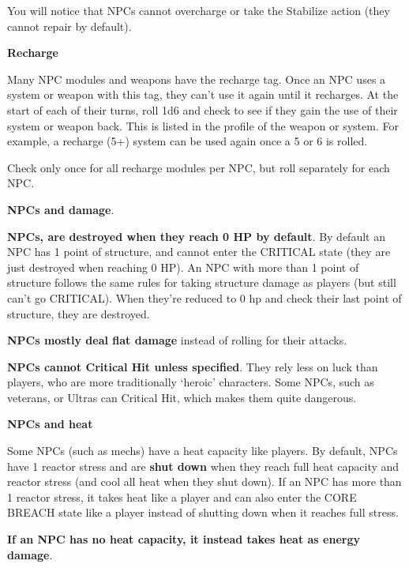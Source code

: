 You will notice that NPCs cannot overcharge or take the Stabilize action (they cannot repair by
default).
             
\begin{center}
    \textbf{Recharge}
\end{center}

Many NPC modules and weapons have the recharge tag. Once an NPC uses a system or
weapon with this tag, they can’t use it again until it recharges. At the start of each of their turns,
roll 1d6 and check to see if they gain the use of their system or weapon back. This is listed in the
profile of the weapon or system. For example, a recharge (5+) system can be used again once a
5 or 6 is rolled.

Check only once for all recharge modules per NPC, but roll separately for each NPC.
              
\begin{center}
    \textbf{NPCs and damage}.
\end{center}

\textbf{NPCs, are destroyed when they reach 0 HP by default}. By default an NPC has 1 point of
structure, and cannot enter the CRITICAL state (they are just destroyed when reaching 0 HP). An
NPC with more than 1 point of structure follows the same rules for taking structure damage as
players (but still can’t go CRITICAL). When they’re reduced to 0 hp and check their last point of
structure, they are destroyed.

\textbf{NPCs mostly deal flat damage} instead of rolling for their attacks.

\textbf{NPCs cannot Critical Hit unless specified}. They rely less on luck than players, who are more
traditionally ‘heroic’ characters. Some NPCs, such as veterans, or Ultras can Critical Hit, which
makes them quite dangerous.
 
\begin{center}
    \textbf{NPCs and heat}
\end{center}

Some NPCs (such as mechs) have a heat capacity like players. By default, NPCs have 1 reactor
stress and are \textbf{shut down} when they reach full heat capacity and reactor stress (and cool all heat
when they shut down). If an NPC has more than 1 reactor stress, it takes heat like a player and
can also enter the CORE BREACH state like a player instead of shutting down when it reaches
full stress.

\textbf{If an NPC has no heat capacity, it instead takes heat as energy damage}.

